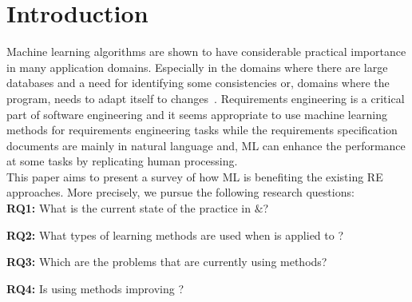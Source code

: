 \section{Introduction}

% 
% 
% 
% 
Machine learning algorithms are shown to have considerable practical importance in many application domains. Especially in the domains where there are large databases and a need for identifying some consistencies or, domains where the program, needs to adapt itself to changes~\cite{Zhang2002}. Requirements engineering is a critical part of software engineering and it seems appropriate to use machine learning methods for requirements engineering tasks while the requirements specification documents are mainly in natural language and, ML can enhance the performance at some tasks by replicating human processing. \\
This paper aims to present a survey of how ML is benefiting the existing RE approaches. More precisely, we pursue the following research questions: \\
\noindent
\textbf{RQ1:} What is the current state of the practice in \ML${\&}$\RE?

\noindent
\textbf{RQ2:} What types of learning methods are used when \ML is applied to
\RE?

\noindent
\textbf{RQ3:} Which are the \RE problems that are currently using \ML methods?

\noindent
\textbf{RQ4:} Is using \ML methods improving \RE?

